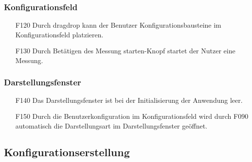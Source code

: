 \documentclass[parskip=full]{scrartcl}
\begin{document}
\subsubsection{Konfigurationsfeld}

\begin{itemize}
\item[F120] Durch \gls{dragdrop} kann der Benutzer Konfigurationsbausteine im Konfigurationsfeld platzieren.
\item[F130] Durch Betätigen des Messung starten-Knopf startet der Nutzer eine Messung.
\end{itemize}


\subsubsection{Darstellungsfenster}

\begin{itemize}
\item[F140] Das Darstellungsfenster ist bei der Initialisierung der Anwendung leer.
\item[F150] Durch die \gls{Benutzerkonfiguration} im Konfigurationsfeld wird durch F090 automatisch die Darstellungsart im Darstellungsfenster geöffnet.
\end{itemize}



\subsection{Konfigurationserstellung}
\end{document}
